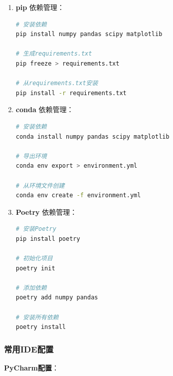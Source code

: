 \begin{enumerate}
\def\labelenumi{\arabic{enumi}.}
\item
  \textbf{pip} 依赖管理：

\begin{lstlisting}[language=bash]
# 安装依赖
pip install numpy pandas scipy matplotlib

# 生成requirements.txt
pip freeze > requirements.txt

# 从requirements.txt安装
pip install -r requirements.txt
\end{lstlisting}
\item
  \textbf{conda} 依赖管理：

\begin{lstlisting}[language=bash]
# 安装依赖
conda install numpy pandas scipy matplotlib

# 导出环境
conda env export > environment.yml

# 从环境文件创建
conda env create -f environment.yml
\end{lstlisting}
\item
  \textbf{Poetry} 依赖管理：

\begin{lstlisting}[language=bash]
# 安装Poetry
pip install poetry

# 初始化项目
poetry init

# 添加依赖
poetry add numpy pandas

# 安装所有依赖
poetry install
\end{lstlisting}
\end{enumerate}

\subsubsection{常用IDE配置}\label{ux5e38ux7528ideux914dux7f6e}

\textbf{PyCharm配置}：

